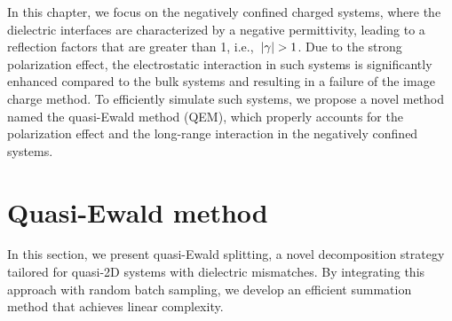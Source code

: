 In this chapter, we focus on the negatively confined charged systems, where the dielectric interfaces are characterized by a negative permittivity, leading to a reflection factors that are greater than 1, i.e.,~$\lvert\gamma\rvert > 1$.
Due to the strong polarization effect, the electrostatic interaction in such systems is significantly enhanced compared to the bulk systems and resulting in a failure of the image charge method.
To efficiently simulate such systems, we propose a novel method named the quasi-Ewald method (QEM), which properly accounts for the polarization effect and the long-range interaction in the negatively confined systems.

\section{Quasi-Ewald method}

In this section, we present quasi-Ewald splitting, a novel decomposition strategy tailored for quasi-2D systems with dielectric mismatches. By integrating this approach with random batch sampling, we develop an efficient summation method that achieves linear complexity.
